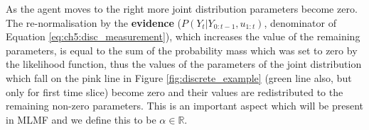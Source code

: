 As the agent moves to the right more joint distribution parameters become zero. The re-normalisation by the \textbf{evidence} ($P(Y_t|Y_{0:t-1},u_{1:t})$, denominator of Equation \ref{eq:ch5:disc_measurement}), 
which increases the value of the remaining parameters, is equal to the sum of the probability mass which was set to zero by the likelihood function,
thus the values of the parameters of the joint distribution which fall on the pink line in Figure \ref{fig:discrete_example} 
(green line also, but only for first time slice) become zero and their values are redistributed to the remaining non-zero parameters. 
This is an important aspect which will be present in MLMF and we define this to be $\alpha \in \mathbb{R}$.




